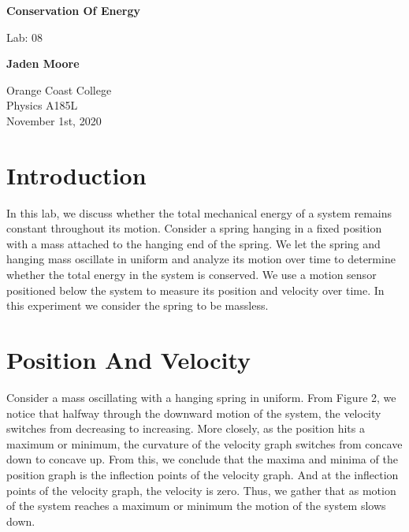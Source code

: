 \documentclass[12pt]{article}
\begin{document}

\begin{titlepage}
    \begin{center}
        \vspace*{1cm}
        \textbf{Conservation Of Energy}

        \vspace{0.5cm}
        Lab: 08

        \vspace{1cm}

        \textbf{Jaden Moore}

        \vfill

        Orange Coast College\\
        Physics A185L\\
        November 1st, 2020

    \end{center}
\end{titlepage}

\pagestyle{fancy}
\fancyhf{}
\setlength{\headheight}{15pt}
\cfoot{\thepage}

\section{Introduction}
In this lab, we discuss whether the total mechanical energy of a system remains constant throughout its motion. Consider a spring hanging in a fixed position with a mass attached to the hanging end of the spring. We let the spring and hanging mass oscillate in uniform and analyze its motion over time to determine whether the total energy in the system is conserved. We use a motion sensor positioned below the system to measure its position and velocity over time. In this experiment we consider the spring to be massless.
\section{Position And Velocity}
Consider a mass oscillating with a hanging spring in uniform. From Figure 2, we notice that halfway through the downward motion of the system, the velocity switches from decreasing to increasing. More closely, as the position hits a maximum or minimum, the curvature of the velocity graph switches from concave down to concave up. From this, we conclude that the maxima and minima of the position graph is the inflection points of the velocity graph. And at the inflection points of the velocity graph, the velocity is zero. Thus, we gather that as motion of the system reaches a maximum or minimum the motion of the system slows down.
\end{document}
